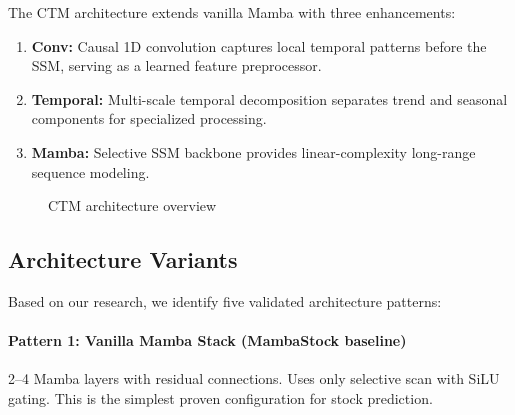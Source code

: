 \documentclass[11pt,a4paper]{article}
\newcommand{\R}{\mathbb{R}}
\begin{document}
The CTM architecture extends vanilla Mamba with three enhancements:

\begin{enumerate}
  \item \textbf{Conv:} Causal 1D convolution captures local temporal patterns
    before the SSM, serving as a learned feature preprocessor.
  \item \textbf{Temporal:} Multi-scale temporal decomposition separates trend
    and seasonal components for specialized processing.
  \item \textbf{Mamba:} Selective SSM backbone provides linear-complexity
    long-range sequence modeling.
\end{enumerate}

\begin{figure}[h]
\centering
{}
\caption{CTM architecture overview}
\label{fig:arch}
\end{figure}

\subsection{Architecture Variants}

Based on our research, we identify five validated architecture patterns:

\paragraph{Pattern 1: Vanilla Mamba Stack (MambaStock baseline)}
2--4 Mamba layers with residual connections. Uses only selective scan with
SiLU gating. This is the simplest proven configuration for stock prediction.
\end{document}
